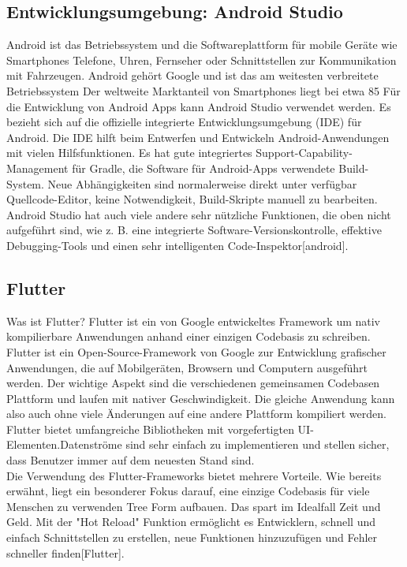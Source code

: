 \subsection{Entwicklungsumgebung: Android Studio}
Android ist das Betriebssystem und die Softwareplattform für mobile Geräte wie Smartphones
Telefone, Uhren, Fernseher oder Schnittstellen zur Kommunikation mit Fahrzeugen.
Android gehört Google und ist das am weitesten verbreitete Betriebssystem
Der weltweite Marktanteil von Smartphones liegt bei etwa 85 %
Für die Entwicklung von Android Apps kann Android Studio verwendet werden. 
Es bezieht sich auf die offizielle integrierte Entwicklungsumgebung (IDE) für Android. Die IDE hilft beim Entwerfen und Entwickeln Android-Anwendungen mit vielen Hilfsfunktionen. Es hat gute integriertes Support-Capability-Management für Gradle, die Software für Android-Apps verwendete Build-System. Neue Abhängigkeiten sind normalerweise direkt unter verfügbar Quellcode-Editor, keine Notwendigkeit, Build-Skripte manuell zu bearbeiten. 
Android Studio hat auch viele andere sehr nützliche Funktionen, die oben nicht aufgeführt sind, wie z. B. eine integrierte Software-Versionskontrolle, effektive Debugging-Tools und einen sehr intelligenten Code-Inspektor[android].
\subsection{Flutter}
Was ist Flutter? Flutter ist ein von Google entwickeltes Framework um nativ kompilierbare Anwendungen anhand einer einzigen Codebasis zu schreiben.
Flutter ist ein Open-Source-Framework von Google zur Entwicklung grafischer Anwendungen, die auf Mobilgeräten, Browsern und Computern ausgeführt werden. Der wichtige Aspekt sind die verschiedenen gemeinsamen Codebasen
Plattform und laufen mit nativer Geschwindigkeit. Die gleiche Anwendung kann also auch ohne viele Änderungen auf eine andere Plattform kompiliert werden. Flutter bietet umfangreiche Bibliotheken mit vorgefertigten UI-Elementen.Datenströme sind sehr einfach zu implementieren und stellen sicher, dass Benutzer immer auf dem neuesten Stand sind.\\
Die Verwendung des Flutter-Frameworks bietet mehrere Vorteile. Wie bereits erwähnt, liegt ein besonderer Fokus darauf, eine einzige Codebasis für viele Menschen zu verwenden Tree Form aufbauen. Das spart im Idealfall Zeit und Geld. Mit der "Hot Reload" Funktion ermöglicht es Entwicklern, schnell und einfach Schnittstellen zu erstellen, neue Funktionen hinzuzufügen und  
Fehler schneller finden[Flutter].
